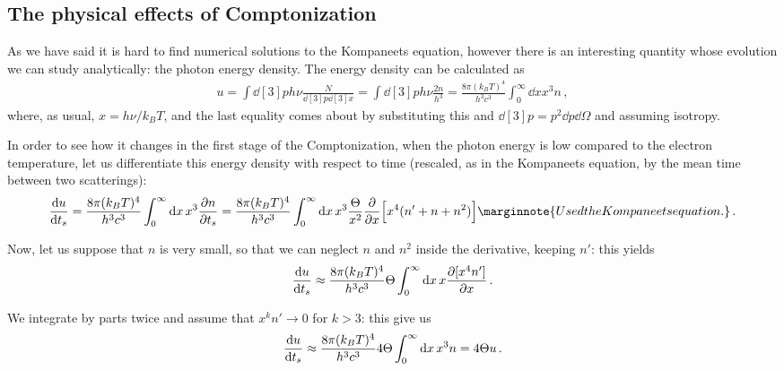 \documentclass[main.tex]{subfiles}
\begin{document}
\subsection{The physical effects of Comptonization}


As we have said it is hard to find numerical solutions to the Kompaneets equation, however there is an interesting quantity whose evolution we can study analytically: the photon energy density. 
The energy density can be calculated as 
%
\begin{align}
u = \int \dd[3]{p} h \nu \frac{N}{ \dd[3]{p}\dd[3]{x}}
= \int \dd[3]{p} h \nu   \frac{2 n}{h^3} 
= \frac{8 \pi (k_B T)^{4}}{h^3c^3} \int_0^{\infty } \dd{x} x^3 n
\,,
\end{align}
%
where, as usual, \(x = h \nu / k_B T\), and the last equality comes about by substituting this and \(\dd[3]{p} = p^2 \dd{p} \dd{\Omega }\) and assuming isotropy. 

In order to see how it changes in the first stage of the Comptonization, when the photon energy is low compared to the electron temperature, let us differentiate this energy density with respect to time (rescaled, as in the Kompaneets equation, by the mean time between two scatterings): 
%
\begin{align}
\dv{u}{t_s} 
= \frac{8 \pi (k_B T)^{4}}{h^3c^3} \int_0^{\infty } \dd{x} x^3 \pdv{n}{t_s}
= \frac{8 \pi (k_B T)^{4}}{h^3c^3} \int_0^{\infty } \dd{x} x^3 \frac{\Theta}{x^2} \pdv{}{x} \qty[x^{4 } (n' + n + n^2)]
\marginnote{Used the Kompaneets equation.}
\,.
\end{align}

Now, let us suppose that \(n\) is very small, so that we can neglect \(n\) and \(n^2\) inside the derivative, keeping \(n'\): this yields 
%
\begin{align}
\dv{u}{t_s} \approx \frac{8 \pi (k_B T)^{4}}{h^3 c^3} \Theta \int_0^{\infty } \dd{x} x \pdv{[x^{4} n']}{x}
\,.
\end{align}

We integrate by parts twice and assume that \(x^{k} n' \to 0 \) for \(k> 3\): this give us 
%
\begin{align}
\dv{u}{t_s} \approx \frac{8 \pi (k_B T)^{4}}{h^3 c^3} 4 \Theta \int_0^{\infty } \dd{x} x^3 n = 4 \Theta u
\,.
\end{align}
\end{document}
